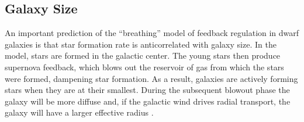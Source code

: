 \documentclass[iop]{emulateapj}
\begin{document}




\subsection{Galaxy Size}

An important prediction of the ``breathing'' model of feedback regulation in dwarf galaxies is that star formation rate is anticorrelated with galaxy size. In the model, stars are formed in the galactic center. The young stars then produce supernova feedback, which blows out the reservoir of gas from which the stars were formed, dampening star formation. As a result, galaxies are actively forming stars when they are at their smallest. During the subsequent blowout phase the galaxy will be more diffuse and, if the galactic wind drives radial transport, the galaxy will have a larger effective radius \citep{EB17}. 
\end{document}
